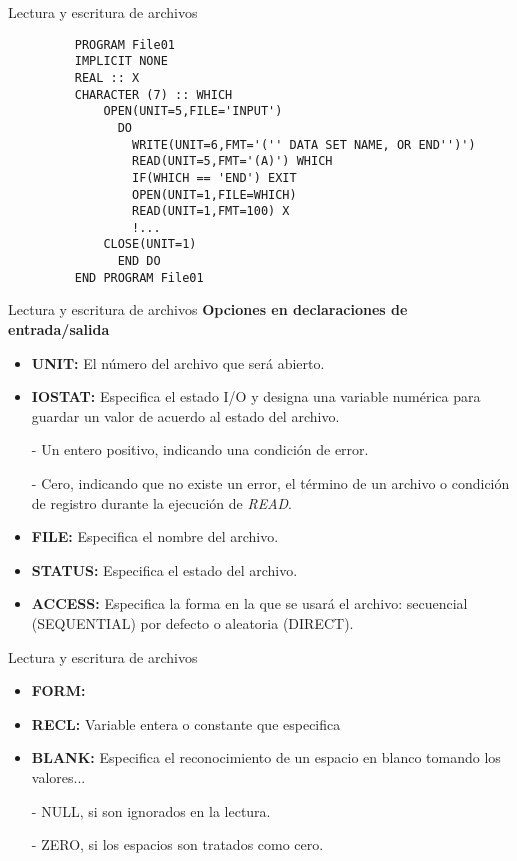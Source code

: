 \begin{frame}[fragile]{Lectura y escritura de archivos}
  \begin{itemize}
   \item []
    \begin{verbatim}
      PROGRAM File01
      IMPLICIT NONE
      REAL :: X
      CHARACTER (7) :: WHICH
          OPEN(UNIT=5,FILE='INPUT')
            DO
              WRITE(UNIT=6,FMT='('' DATA SET NAME, OR END'')')
              READ(UNIT=5,FMT='(A)') WHICH
              IF(WHICH == 'END') EXIT
              OPEN(UNIT=1,FILE=WHICH)
              READ(UNIT=1,FMT=100) X
              !...
          CLOSE(UNIT=1)
            END DO
      END PROGRAM File01
    \end{verbatim}
  \end{itemize}
\end{frame}

\begin{frame}[fragile]{Lectura y escritura de archivos}
 \textbf{Opciones en declaraciones de entrada/salida}
  \begin{itemize}[<+(1)->]
   \item \textbf{UNIT:} El número del archivo que será abierto.
   \item \textbf{IOSTAT:} Especifica el estado I/O y designa una variable numérica para guardar un valor de acuerdo al estado del archivo. 
   \item [-] Un entero positivo, indicando una condición de error.
   \item [-] Cero, indicando que no existe un error, el término de un archivo o condición de registro durante la ejecución de \emph{READ}.
   \item \textbf{FILE:} Especifica el nombre del archivo.
   \item \textbf{STATUS:} Especifica el estado del archivo.
   \item \textbf{ACCESS:} Especifica la forma en la que se usará el archivo: secuencial (SEQUENTIAL) por defecto o aleatoria (DIRECT). 
  \end{itemize}
\end{frame}

\begin{frame}[fragile]{Lectura y escritura de archivos}
  \begin{itemize}[<+(0)->]
   \item \textbf{FORM:} 
   \item \textbf{RECL:} Variable entera o constante que especifica 
   \item \textbf{BLANK:} Especifica el reconocimiento de un espacio en blanco tomando los valores...
   \item [-] NULL, si son ignorados en la lectura.
   \item [-] ZERO, si los espacios son tratados como cero.
  \end{itemize}
\end{frame}

